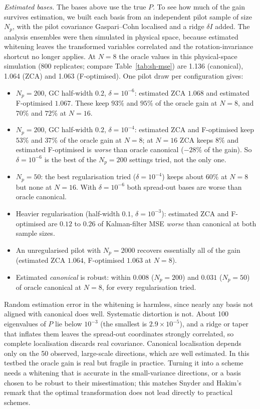 \documentclass[11pt,a4paper]{article}
\numberwithin{equation}{section}
\theoremstyle{remark}\newtheorem{remark}[theorem]{Remark}
\begin{document}
\emph{Estimated bases.} The bases above use the true \(P\). To see how much of the gain survives
estimation, we built each basis from an independent pilot sample of size \(N_p\), with the pilot
covariance Gaspari--Cohn localised and a ridge \(\delta I\) added. The analysis ensembles were
then simulated in physical space, because estimated whitening leaves the transformed variables
correlated and the rotation-invariance shortcut no longer applies. At \(N=8\) the oracle values in this physical-space simulation (800 replicates; compare
Table~\ref{tab:sh-mse}) are 1.136 (canonical), 1.064 (ZCA) and 1.063 (F-optimised). One pilot
draw per configuration gives:
\begin{itemize}
\item \(N_p=200\), GC half-width \(0.2\), \(\delta=10^{-6}\): estimated ZCA \(1.068\) and estimated
 F-optimised \(1.067\). These keep \(93\%\) and \(95\%\) of the oracle gain at \(N=8\), and \(70\%\) and
 \(72\%\) at \(N=16\).
\item \(N_p=200\), GC half-width \(0.2\), \(\delta=10^{-4}\): estimated ZCA and F-optimised keep \(53\%\)
 and \(37\%\) of the oracle gain at \(N=8\); at \(N=16\) ZCA keeps \(8\%\) and estimated F-optimised is
 \emph{worse} than oracle canonical (\(-28\%\) of the gain). So \(\delta=10^{-6}\) is the best of the
 \(N_p=200\) settings tried, not the only one.
\item \(N_p=50\): the best regularisation tried (\(\delta=10^{-4}\)) keeps about \(60\%\) at \(N=8\) but
 none at \(N=16\). With \(\delta=10^{-6}\) both spread-out bases are worse than oracle canonical.
\item Heavier regularisation (half-width \(0.1\), \(\delta=10^{-3}\)): estimated ZCA and F-optimised
 are \(0.12\) to \(0.26\) of Kalman-filter MSE \emph{worse} than canonical at both sample sizes.
\item An unregularised pilot with \(N_p=2000\) recovers essentially all of the gain (estimated ZCA
 \(1.064\), F-optimised \(1.063\) at \(N=8\)).
\item Estimated \emph{canonical} is robust: within \(0.008\) (\(N_p=200\)) and \(0.031\) (\(N_p=50\)) of
 oracle canonical at \(N=8\), for every regularisation tried.
\end{itemize}
Random estimation error in the whitening is harmless, since nearly any basis not aligned with
canonical does well. Systematic distortion is not. About 100 eigenvalues of \(P\) lie below
\(10^{-3}\) (the smallest is \(2.9\times10^{-5}\)), and a ridge or taper that inflates them leaves
the spread-out coordinates strongly correlated, so complete localisation discards real
covariance. Canonical localisation depends only on the 50 observed, large-scale directions,
which are well estimated. In this testbed the oracle gain is real but fragile in practice.
Turning it into a scheme needs a whitening that is accurate in the small-variance directions,
or a basis chosen to be robust to their misestimation; this matches Snyder and Hakim's remark
that the optimal transformation does not lead directly to practical schemes.
\end{document}
